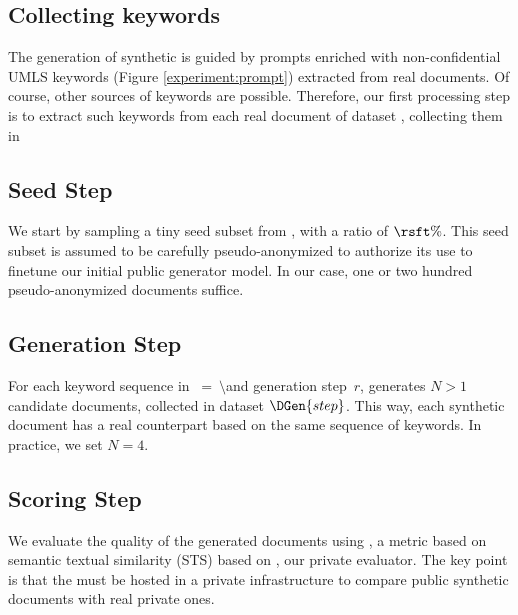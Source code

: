 \subsection{Collecting keywords}

The generation of synthetic  is guided by prompts enriched with non-confidential UMLS keywords (Figure \ref{experiment:prompt}) extracted from real documents. Of course, other sources of keywords are possible. Therefore, our first processing step is to extract such keywords from each real document of dataset \dgen, collecting them in \kgen

\subsection{Seed Step}

We start by sampling a tiny seed subset \dsft from \dgen, with a ratio of $\rsft\%$. This seed subset is assumed to be carefully pseudo-anonymized to authorize its use to finetune our initial public generator model. In our case, one or two hundred pseudo-anonymized documents suffice.

\subsection{Generation Step}
For each keyword sequence in \ktr$~=~$\kgen$\setminus$\ksft and generation step~$r$, \mg generates $N>1$ candidate documents, collected in dataset $\DGen{step}$. This way, each synthetic document has a real counterpart based on the same sequence of keywords. In practice, we set $N=4$.

\subsection{Scoring Step}
\label{subsec:scoring-step}

We evaluate the quality of the generated documents using \score \cite{aynetdinov_semscore_2024}, a metric based on semantic textual similarity (STS) based on \me, our private evaluator. The key point is that the \me must be hosted in a private infrastructure to compare public synthetic documents with real private ones.

